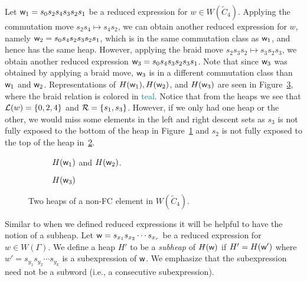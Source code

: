 \begin{example}
Let $\mathsf{w}_1=s_0s_2s_4s_3s_2s_1$ be a reduced expression for $w \in W(\widetilde{C}_4)$. Applying the commutation move $s_2s_4\mapsto s_4s_2$, we can obtain another reduced expression for $w$, namely $\mathsf{w}_2=s_0s_4s_2s_3s_2s_1$, which is in the same commutation class as $\mathsf{w}_1$, and hence has the same heap. However, applying the braid move $s_2s_3s_2 \mapsto s_3s_2s_3$, we obtain another reduced expression $\mathsf{w}_3=s_0s_4s_3s_2s_3s_1$. Note that since $\mathsf{w}_3$ was obtained by applying a braid move, $\mathsf{w}_3$ is in a different commutation class than $\mathsf{w}_1$ and $\mathsf{w}_2$. Representations of $H(\mathsf{w}_1), H(\mathsf{w}_2)$, and $H(\mathsf{w}_3)$ are seen in Figure~\ref{fig:not FC}, where the braid relation is colored in \textcolor{teal}{teal}. Notice that from the heaps we see that $\mathcal{L}(w)=\{0,2,4\}$ and $\mathcal{R}=\{s_1,s_3\}$. However, if we only had one heap or the other, we would miss some elements in the left and right descent sets as $s_3$ is not fully exposed to the bottom of the heap in Figure~\ref{fig:notFC2} and $s_2$ is not fully exposed to the top of the heap in~\ref{fig:notFC3}. 

\begin{figure}[h]
\centering
\begin{subfigure}[b]{0.3\textwidth}	
\centering
{}
\caption{$H(\mathsf{w}_1)$ and $H(\mathsf{w}_2)$.}\label{fig:notFC2}
\end{subfigure}
\begin{subfigure}[b]{0.3\textwidth}	
\centering
{}
\caption{$H(\mathsf{w}_3)$}\label{fig:notFC3}
\end{subfigure}
\caption{Two heaps of a non-FC element in $W(\widetilde{C}_4)$.}	
\label{fig:not FC}
\end{figure}
\end{example}

Similar to when we defined reduced expressions it will be helpful to have the notion of a subheap. Let $\mathsf{w}=s_{x_1}s_{x_2} \cdots s_{x_r}$ be a reduced expression for $w \in W(\Gamma)$. We define a heap $H'$ to be a \emph{subheap} of $H(\mathsf{w})$ if $H'=H(\mathsf{w}')$ where $w'=s_{y_1}s_{y_2} \cdots s_{y_k}$ is a subexpression of $\mathsf{w}$. We emphasize that the subexpression need not be a subword (i.e., a consecutive subexpression).

